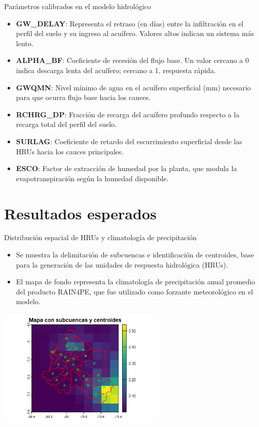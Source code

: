 \documentclass{beamer}
\begin{document}
\begin{frame}{Parámetros calibrados en el modelo hidrológico}
  \small
  \begin{itemize}
    \item \textbf{GW\_DELAY}: Representa el retraso (en días) entre la infiltración en el perfil del suelo y su ingreso al acuífero. Valores altos indican un sistema más lento.
    \item \textbf{ALPHA\_BF}: Coeficiente de recesión del flujo base. Un valor cercano a 0 indica descarga lenta del acuífero; cercano a 1, respuesta rápida.
    \item \textbf{GWQMN}: Nivel mínimo de agua en el acuífero superficial (mm) necesario para que ocurra flujo base hacia los cauces.
    \item \textbf{RCHRG\_DP}: Fracción de recarga del acuífero profundo respecto a la recarga total del perfil del suelo.
    \item \textbf{SURLAG}: Coeficiente de retardo del escurrimiento superficial desde las HRUs hacia los cauces principales.
    \item \textbf{ESCO}: Factor de extracción de humedad por la planta, que modula la evapotranspiración según la humedad disponible.
  \end{itemize}
\end{frame}

\section{Resultados esperados}
\begin{frame}{Distribución espacial de HRUs y climatología de precipitación}
  \small
  \begin{itemize}
    \item Se muestra la delimitación de subcuencas e identificación de centroides, base para la generación de las unidades de respuesta hidrológica (HRUs).
    \item El mapa de fondo representa la climatología de precipitación anual promedio del producto RAIN4PE, que fue utilizado como forzante meteorológico en el modelo.
  \end{itemize}
  \vspace{0.1cm}
  \begin{center}
    \includegraphics[width=0.60\textwidth]{centroides_clima.png}
  \end{center}
\end{frame}
\end{document}
